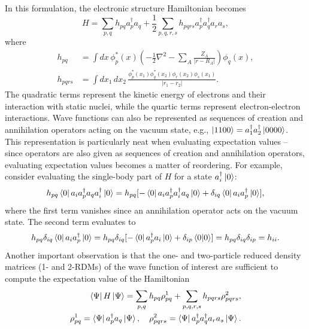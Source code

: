 \documentclass[../main.tex]{subfiles}
\begin{document}
In this formulation, the electronic structure Hamiltonian becomes \cite{helgaker2014molecular, szabo2012modern}
\begin{equation}\label{eq:2ndelectronicham}
    H = \sum_{p,q} h_{pq} a_p^\dagger a_q + \frac{1}{2} \sum_{p,q,r,s} h_{pqrs} a_p^\dagger a_q^\dagger a_r a_s,
\end{equation}
where
\begin{align}\label{eq:molecularintegs}
    h_{pq} &= \int dx\, \phi^*_p (x) \left( - \frac{1}{2} \nabla^2 - \sum_A \frac{Z_A}{|r - R_A|} \right) \phi_q (x),  \\
    h_{pqrs} & = \int dx_1\,dx_2\, \frac{\phi^*_p (x_1) \phi^*_q (x_2) \phi_r (x_2) \phi_s (x_1)}{|r_1 - r_2|} .
\end{align} 
 The quadratic terms represent the kinetic energy of electrons and their interaction with static nuclei, while the quartic terms represent electron-electron interactions. Wave functions can also be represented as sequences of creation and annihilation operators acting on the vacuum state, e.g., $\ket{1100} = a^\dagger_1 a^\dagger_2 \ket{0000}$. This representation is particularly neat when evaluating expectation values -- since operators are also given as sequences of creation and annihilation operators, evaluating expectation values becomes a matter of reordering. For example, consider evaluating the single-body part of $H$ for a state $a_i^\dagger \ket{0}$:
\begin{equation}
            h_{pq} \bra{0}a_i a_p^\dagger a_q a_i^\dagger \ket{0} = h_{pq} [ - \bra{0}a_i a_p^\dagger  a_i^\dagger a_q \ket{0} + \delta_{iq} \bra{0}a_i a_p^\dagger \ket{0}],
\end{equation} where the first term vanishes since an annihilation operator acts on the vacuum state. The second term evaluates to
\begin{equation}
            h_{pq} \delta_{iq} \bra{0}a_i a_p^\dagger \ket{0} =   h_{pq} \delta_{iq}[- \bra{0}a_p^\dagger a_i \ket{0} + \delta_{ip} \braket{0}] = h_{pq} \delta_{iq} \delta_{ip} = h_{ii}.
\end{equation} Another important observation is that the one- and two-particle reduced density matrices (1- and 2-RDMs) of the wave function of interest are sufficient to compute the expectation value of the Hamiltonian  \cite{helgaker2014molecular}
\begin{align}\label{eq:rdms}
        \bra{\Psi}H\ket{\Psi} = \sum_{p,q} h_{pq} \rho^1_{pq} + \sum_{p,q,r,s} h_{pqrs} \rho^2_{pqrs},  \\
        \rho^1_{pq} = \bra{\Psi}a^\dagger_p a_q\ket{\Psi}, \quad \rho^2_{pqrs} = \bra{\Psi}a^\dagger_p a^\dagger_q a_r a_s \ket{\Psi}.
\end{align}
\end{document}

